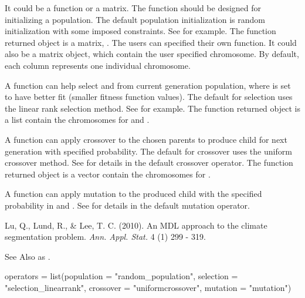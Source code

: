 \documentclass[a4paper]{book}
\begin{document}
\begin{Arguments}
\begin{ldescription}
\item[\code{population}] It could be a function or a matrix. The function should be designed for initializing a population. The default population initialization is random initialization with some imposed constraints. See  for example. The function returned object is a matrix, . The users can specified their own  function. It could also be a matrix object, which contain the user specified chromosome. By default, each column represents one individual chromosome.
\item[\code{selection}] A function can help select  and  from current generation population, where  is set to have better fit (smaller fitness function values). The default for selection uses the linear rank selection method. See  for example. The function returned object is a list contain the chromosomes for  and .
\item[\code{crossover}] A function can apply crossover to the chosen parents to produce child for next generation with specified probability. The default for crossover uses the uniform crossover method. See  for details in the default crossover operator. The function returned object is a vector contain the chromosomes for .
\item[\code{mutation}] A function can apply mutation to the produced child with the specified probability  in  and . See  for details in the default mutation operator.
\end{ldescription}
\end{Arguments}
%
\begin{References}
Lu, Q., Lund, R., \& Lee, T. C. (2010). An MDL approach to the climate segmentation problem.
\emph{Ann. Appl. Stat.} 4 (1) 299 - 319.
\end{References}
%
\begin{SeeAlso}
See Also as .
\end{SeeAlso}
%
\begin{Examples}
\begin{ExampleCode}
operators = list(population = "random_population",
                 selection  = "selection_linearrank",
                 crossover  = "uniformcrossover",
                 mutation   = "mutation")
\end{ExampleCode}
\end{Examples}
\end{document}
